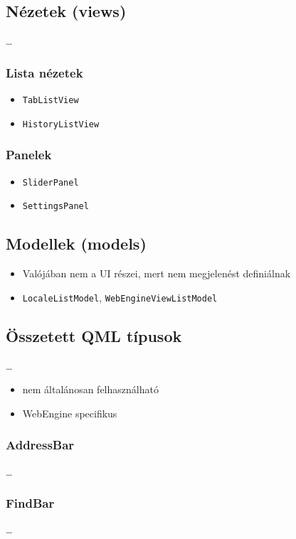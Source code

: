\documentclass[12pt]{report}
\begin{document}
\subsection{Nézetek (views)}
\dots

\subsubsection{Lista nézetek}
\begin{itemize}
    \item \texttt{TabListView}
    \item \texttt{HistoryListView}
\end{itemize}

\subsubsection{Panelek}
\begin{itemize}
    \item \texttt{SliderPanel}
    \item \texttt{SettingsPanel}
\end{itemize}

\subsection{Modellek (models)}
\begin{itemize}
    \item Valójában nem a UI részei, mert nem megjelenést definiálnak
    \item \texttt{LocaleListModel}, \texttt{WebEngineViewListModel}
\end{itemize}

\subsection{Összetett QML típusok}
\dots
\begin{itemize}
    \item nem általánosan felhasználható
    \item WebEngine specifikus
\end{itemize}

\subsubsection{AddressBar}
\dots

\subsubsection{FindBar}
\dots
\end{document}
